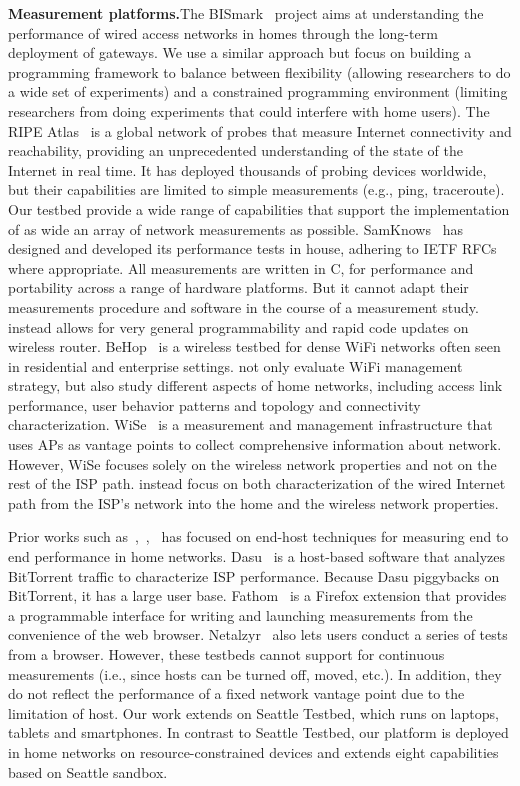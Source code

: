 \textbf{Measurement platforms.}The BISmark~\cite{183951} project aims at understanding the performance of wired access networks in homes through the long-term deployment of gateways. We use a similar approach but focus on building a programming framework to balance between flexibility (allowing researchers to do a wide set of experiments) and a constrained programming environment (limiting researchers from doing experiments that could interfere with home users). The RIPE Atlas~\cite{ripeatlas} is a global network of probes that measure Internet connectivity and reachability, providing an unprecedented understanding of the state of the Internet in real time. It has deployed thousands of probing devices worldwide, but their capabilities are limited to simple measurements (e.g., ping, traceroute). Our testbed provide a wide range of capabilities that support the implementation of as wide an array of network measurements as possible. SamKnows~\cite{samknows} has designed and developed its performance tests in house, adhering to IETF RFCs where appropriate. All measurements are written in C, for performance and portability across a range of hardware platforms. But it cannot adapt their measurements procedure and software in the course of a measurement study. \sysname instead allows for very general programmability and rapid code updates on wireless router. BeHop~\cite{yiakoumis2014behop} is a wireless testbed for dense WiFi networks often seen in residential and enterprise settings. \sysname not only evaluate WiFi management strategy, but also study different aspects of home networks, including access link performance, user behavior patterns and topology and connectivity characterization. WiSe~\cite{patro2013observing} is a measurement and management infrastructure that uses APs as vantage points to collect comprehensive information about network. However, WiSe focuses solely on the wireless network properties and not on the rest of the ISP path. \sysname instead focus on both characterization of the wired Internet path from the ISP’s network into the home and the wireless network properties.

Prior works such as~\cite{sanchez2014measurement},~\cite{dhawan2012fathom},~\cite{kreibich2010netalyzr} has focused on end-host techniques for measuring end to end performance in home networks. Dasu~\cite{sanchez2014measurement} is a host-based software that analyzes BitTorrent traffic to characterize ISP performance. Because Dasu piggybacks on BitTorrent, it has a large user base. Fathom~\cite{dhawan2012fathom} is a Firefox extension that provides a programmable interface for writing and launching measurements from the convenience of the web browser. Netalzyr~\cite{kreibich2010netalyzr} also lets users conduct a series of tests from a browser. However, these testbeds cannot support for continuous measurements (i.e., since hosts can be turned off, moved, etc.). In addition, they do not reflect the performance of a fixed network vantage point due to the limitation of host. Our work extends on Seattle Testbed\cite{cappos2009seattle}, which runs on laptops, tablets and smartphones. In contrast to Seattle Testbed, our platform is deployed in home networks on resource-constrained devices and extends eight capabilities based on Seattle sandbox.

